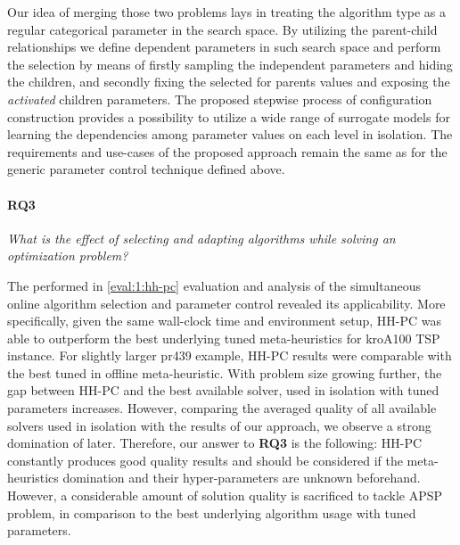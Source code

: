 Our idea of merging those two problems lays in treating the algorithm type as a regular categorical parameter in the search space. By utilizing the parent-child relationships we define dependent parameters in such search space and perform the selection by means of firstly sampling the independent parameters and hiding the children, and secondly fixing the selected for parents values and exposing the \emph{activated} children parameters. The proposed stepwise process of configuration construction provides a possibility to utilize a wide range of surrogate models for learning the dependencies among parameter values on each level in isolation. The requirements and use-cases of the proposed approach remain the same as for the generic parameter control technique defined above.


\paragraph{RQ3} \emph{What is the effect of selecting and adapting algorithms while solving an optimization problem?}

The performed in \cref{eval:1:hh-pc} evaluation and analysis of the simultaneous online algorithm selection and parameter control revealed its applicability. More specifically, given the same wall-clock time and environment setup, HH-PC was able to outperform the best underlying tuned meta-heuristics for kroA100 TSP instance. For slightly larger pr439 example, HH-PC results were comparable with the best tuned in offline meta-heuristic. With problem size growing further, the gap between HH-PC and the best available solver, used in isolation with tuned parameters increases. However, comparing the averaged quality of all available solvers used in isolation with the results of our approach, we observe a strong domination of later. Therefore, our answer to \textbf{RQ3} is the following: HH-PC constantly produces good quality results and should be considered if the meta-heuristics domination and their hyper-parameters are unknown beforehand. However, a considerable amount of solution quality is sacrificed to tackle APSP problem, in comparison to the best underlying algorithm usage with tuned parameters.


